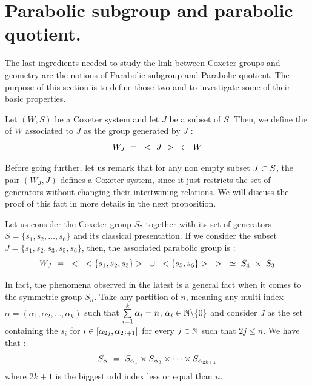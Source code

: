 \section{Parabolic subgroup and parabolic quotient.}
The last ingredients needed to study the link between Coxeter groups and geometry are the notions of Parabolic subgroup and Parabolic quotient. The purpose of this section is to define those two and to investigate some of their basic properties.

\begin{definition}
	Let $(W,S)$ be a Coxeter system and let $J$ be a subset of $S$. Then, we define the  of $W$ associated to $J$ as the group generated by $J$ :
	\begin{equation}
	W_J\text{ }=\text{ } <\text{ } J\text{ } >\text{ } \subset \text{ } W
	\end{equation}
\end{definition}
\begin{remark}
	Before going further, let us remark that for any non empty subset $J\subset S$, the pair $(W_J,J)$ defines a Coxeter system, since it just restricts the set of generators without changing their intertwining relations. We will discuss the proof of this fact in more details in the next proposition.
\end{remark}
\begin{example}
	Let us consider the Coxeter group $S_7$ together with its set of generators  $S=\{s_1,s_2,\dots, s_6\}$ and its classical presentation. If we consider the subset $J=\{s_1,s_2,s_3,s_5,s_6\}$, then, the associated parabolic group is :
	\begin{equation}
	W_J\text{ }=\text{ } <\text{ } <\{s_1,s_2,s_3\}>\text{ } \cup \text{ } <\{s_5,s_6\}>\text{ } >\text{ } \simeq\text{ } S_4\text{ } \times \text{ } S_3
	\end{equation}
\end{example}
In fact, the phenomena observed in the latest is a general fact when it comes to the symmetric group $S_n$. Take any partition of $n$, meaning any multi index $\alpha=(\alpha_1,\alpha_2,\dots, \alpha_k)$ such that $\sum\limits_{i=1}^{k}\alpha_i=n$, $\alpha_i\in \mathbb N\backslash\{0\}$ and consider $J$ as the set containing the $s_i$ for $i\in \lbrack \alpha_{2j},\alpha_{2j+1}\rbrack$ for every $j\in \mathbb N$ such that $2j\leq n$. We have that :
\begin{equation}
S_\alpha\text{ }=\text{ } S_{\alpha_1}\times S_{\alpha_3}\times \dots \times S_{\alpha_{2k+1}}
\end{equation}
where $2k+1$ is the biggest odd index less or equal than $n$.

